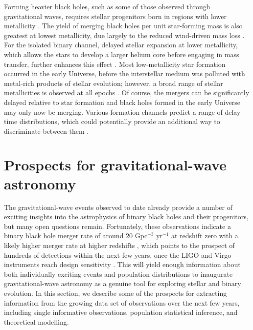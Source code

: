 \documentclass[review]{elsarticle}
\begin{document}
Forming heavier black holes, such as some of those observed through gravitational waves, requires stellar progenitors born in regions with lower metallicity \citep{Belczynski:2016}. The yield of merging black holes per unit star-forming mass is also greatest at lowest metallicity, due largely to the reduced wind-driven mass loss \citep[e.g.,][]{Belczynski:2010,Kruckow:2018}. For the isolated binary channel, delayed stellar expansion at lower metallicity, which allows the stars to develop a larger helium core before engaging in mass transfer, further enhances this effect \citep[e.g.,][]{Stevenson:2017}.  Most low-metallicity star formation occurred in the early Universe, before the interstellar medium was polluted with metal-rich products of stellar evolution; however, a broad range of stellar metallicities is observed at all epochs  \citep[e.g.,][]{LangerNorman:2006,TaylorKobayashi:2015}.  Of course, the mergers can be significantly delayed relative to star formation and black holes formed in the early Universe may only now be merging.  Various formation channels predict a range of delay time distributions, which could potentially provide an additional way to discriminate between them \citep{FishbachKalogera:2021time}.  
  

\section{Prospects for gravitational-wave astronomy}\label{prospect}

The gravitational-wave events observed to date already provide a number of exciting insights into the astrophysics of binary black holes and their progenitors, but many open questions remain.  Fortunately, these observations indicate a binary black hole merger rate of around $20$ Gpc$^{-3}$ yr$^{-1}$ at redshift zero with a likely higher merger rate at higher redshifts \citep{GWTC3:pop}, which points to the prospect of hundreds of detections within the next few years, once the LIGO and Virgo instruments reach design sensitivity \citep{scenarios}.  This will yield enough information about both individually exciting events and population distributions to inaugurate gravitational-wave astronomy as a genuine tool for exploring stellar and binary evolution.  In this section, we describe some of the prospects for extracting information from the growing data set of observations over the next few years, including single informative observations, population statistical inference, and theoretical modelling.
\end{document}
